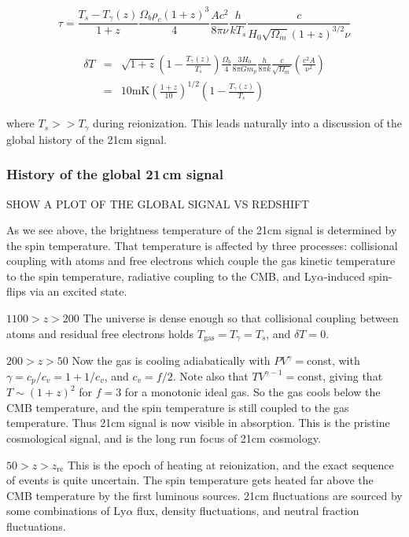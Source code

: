 \begin{equation}
\tau=\frac{T_s-T_\gamma(z)}{1+z}\frac{\Omega_b\rho_c(1+z)^3}{4}\frac{Ac^2}{8\pi\nu}\frac{h}{kT_s}\frac{c}{H_0\sqrt{\Omega_m}(1+z)^{3/2}\nu}
\end{equation}

\begin{eqnarray}
\delta T&=&\sqrt{1+z}\left(1-\frac{T_\gamma(z)}{T_s}\right)\frac{\Omega_b}{4}\frac{3H_0}{8\pi Gm_p}\frac{h}{8\pi k}\frac{c}  {\sqrt{\Omega_m}}\left(\frac{c^2A}{\nu^2}\right)\\
&=&10\text{mK}\left(\frac{1+z}{10}\right)^{1/2}\left(1-\frac{T_\gamma(z)}{T_s}\right)
\end{eqnarray}

where $T_s>>T_\gamma$ during reionization. This leads naturally into a discussion of the global history of the 21cm signal.

\subsubsection{History of the global 21\,cm signal}

SHOW A PLOT OF THE GLOBAL SIGNAL VS REDSHIFT

As we see above, the brightness temperature of the 21cm signal is determined by the spin temperature. That temperature is affected by three processes: collisional coupling with atoms and free electrons which couple the gas kinetic temperature to the spin temperature, radiative coupling to the CMB, and Ly$\alpha$-induced spin-flips via an excited state. 

$1100>z>200$
The universe is dense enough so that collisional coupling between atoms and residual free electrons holds $T_\text{gas}=T_\gamma=T_s$, and $\delta T=0$.

$200>z>50$
Now the gas is cooling adiabatically with $PV^\gamma=$const, with $\gamma=c_p/c_v=1+1/c_v$, and $c_v=f/2$. Note also that $TV^{\gamma-1}=$const, giving that $T\sim (1+z)^2$ for $f=3$ for a monotonic ideal gas. So the gas cools below the CMB temperature, and the spin temperature is still coupled to the gas temperature. Thus 21cm signal is now visible in absorption. This is the pristine cosmological signal, and is the long run focus of 21cm cosmology.

$50>z>z_\text{re}$
This is the epoch of heating at reionization, and the exact sequence of events is quite uncertain. The spin temperature gets heated far above the CMB temperature by the first luminous sources. 21cm fluctuations are sourced by some combinations of Ly$\alpha$ flux, density fluctuations, and neutral fraction fluctuations.  

